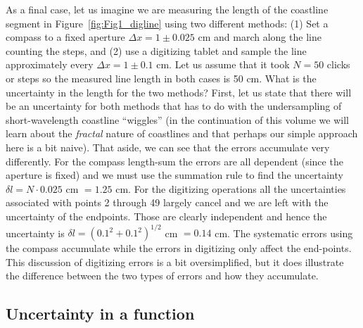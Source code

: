 
	As a final case, let us imagine we are measuring the length of the coastline segment 
in Figure~\ref{fig:Fig1_digline} using two 
different methods: (1) Set a compass to a fixed aperture $\Delta x = 1 \pm 0.025$ cm and march along the 
line counting the steps, and (2) use a digitizing tablet and sample the line approximately every $\Delta x = 1 \pm 0.1$ cm.  
Let us assume that it took $N = 50$ clicks or steps so the measured line length in both cases is 50 cm.  What is the 
uncertainty in the length for the two methods?  First, let us state that there will be an uncertainty 
for both methods that has to do with the undersampling of short-wavelength coastline ``wiggles'' (in the continuation
of this volume we will learn about the \emph{fractal} nature of coastlines and that perhaps our simple approach
here is a bit naive).  That 
aside, we can see that the errors accumulate very differently.  For the compass length-sum the 
errors are all dependent (since the aperture is fixed) and we must use the summation rule to find the uncertainty $\delta l = 
N\cdot 0.025$ cm $= 1.25$ cm.  For the digitizing operations all the uncertainties associated with points 2 
through 49 largely cancel and we are left with the uncertainty of the endpoints.  Those are clearly
independent and hence the uncertainty is $\delta l = (0.1^2 + 0.1^2)^{1/2}$ cm $= 0.14$ cm.  The systematic errors 
using the compass accumulate while the errors in digitizing only affect the end-points.  This 
discussion of digitizing errors is a bit oversimplified, but it does illustrate the difference between 
the two types of errors and how they accumulate.

\subsection{Uncertainty in a function}


